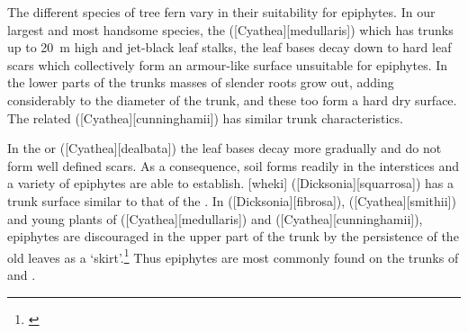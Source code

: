 The different species of tree fern vary in their suitability for epiphytes.
In our largest and most handsome species, the  ([Cyathea][medullaris]) which has trunks up to \SI{20}{\metre} high and jet-black leaf stalks, the leaf bases decay down to hard leaf scars which collectively form an armour-like surface unsuitable for epiphytes.
In the lower parts of the trunks masses of slender roots grow out, adding considerably to the diameter of the trunk, and these too form a hard dry surface.
The related  ([Cyathea][cunninghamii]) has similar trunk characteristics.

In the  or  ([Cyathea][dealbata]) the leaf bases decay more gradually and do not form well defined scars.
As a consequence, soil forms readily in the interstices and a variety of epiphytes are able to establish.
[wheki] ([Dicksonia][squarrosa]) has a trunk surface similar to that of the .
In  ([Dicksonia][fibrosa]),  ([Cyathea][smithii]) and young plants of  ([Cyathea][medullaris]) and  ([Cyathea][cunninghamii]),  epiphytes are discouraged in the upper part of the trunk by the persistence of the old leaves as a `skirt'.\footnote{\cite{page1986tree}}
Thus epiphytes are most commonly found on the trunks of  and .

